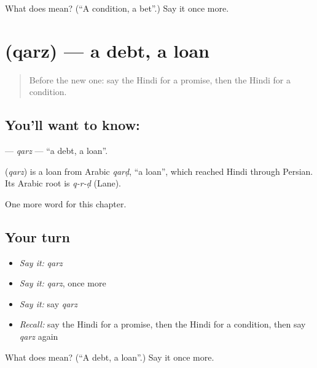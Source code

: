 \begin{tcolorbox}[breakable,colback=teal!4,colframe=teal!35!black,title={Before you move on}]
What does  mean? (\textquotedblleft{}A condition, a bet\textquotedblright{}.) Say it once more.
\end{tcolorbox}
\section[\texorpdfstring{\hi{क़र्ज़} (qarz)}{क़र्ज़ (qarz)}]{ (qarz) — a debt, a loan}

\label{lesson:HI-C207-qarz}



\begin{quote}
Before the new one: say the Hindi for a promise, then the Hindi for a condition.
\end{quote}

\subsection*{You'll want to know: }
\textbf{} — \emph{qarz} — \textquotedblleft{}a debt, a loan\textquotedblright{}.

\begin{cousinweb}
\textbf{} (\emph{qarz}) is a loan from Arabic \emph{qarḍ}, \textquotedblleft{}a loan\textquotedblright{}, which reached Hindi through Persian. Its Arabic root is \emph{q-r-ḍ} (Lane).
\end{cousinweb}

\begin{grammarlens}[title={What you've built}]
One more word for this chapter.
\end{grammarlens}

\subsection*{Your turn}
\begin{itemize}
\raggedright
  \item \emph{Say it:} \emph{qarz}
  \item \emph{Say it:} \emph{qarz}, once more
  \item \emph{Say it:} say \emph{qarz}
  \item \emph{Recall:} say the Hindi for a promise, then the Hindi for a condition, then say \emph{qarz} again
\end{itemize}

\begin{tcolorbox}[breakable,colback=teal!4,colframe=teal!35!black,title={Before you move on}]
What does  mean? (\textquotedblleft{}A debt, a loan\textquotedblright{}.) Say it once more.
\end{tcolorbox}
